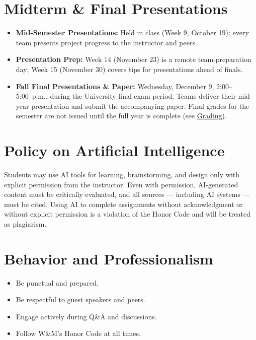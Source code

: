\documentclass[11pt, letterpaper]{article}
\begin{document}
\section{Midterm \& Final Presentations}
\begin{itemize}
    \item \textbf{Mid-Semester Presentations:} Held in class (Week 9, October 19); every team presents project progress to the instructor and peers.
    \item \textbf{Presentation Prep:} Week 14 (November 23) is a remote team-preparation day; Week 15 (November 30) covers tips for presentations ahead of finals.
    \item \textbf{Fall Final Presentations \& Paper:} Wednesday, December 9, 2:00--5:00~p.m., during the University final exam period. Teams deliver their mid-year presentation and submit the accompanying paper. Final grades for the semester are not issued until the full year is complete (see \hyperref[sec:grading]{Grading}).
\end{itemize}

\section{Policy on Artificial Intelligence}
Students may use AI tools for learning, brainstorming, and design only with explicit permission from the instructor. Even with permission, AI-generated content must be critically evaluated, and all sources --- including AI systems --- must be cited. Using AI to complete assignments without acknowledgment or without explicit permission is a violation of the Honor Code and will be treated as plagiarism.

\section{Behavior and Professionalism}
\begin{itemize}
    \item Be punctual and prepared.
    \item Be respectful to guest speakers and peers.
    \item Engage actively during Q\&A and discussions.
    \item Follow W\&M's Honor Code at all times.
\end{itemize}
\end{document}
